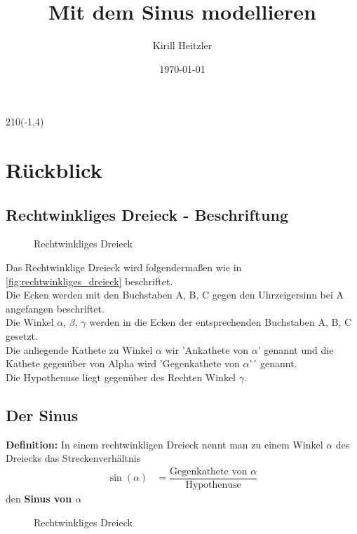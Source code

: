 \documentclass[12pt,a4paper]{article}
\title{Mit dem Sinus modellieren}
\author{Kirill Heitzler}
\date{\today}
\begin{document}
\maketitle
\begin{textblock}{210}(-1,4)
	\begin{figure}[h!] 
	\end{figure}
\end{textblock}
\newpage

\tableofcontents

\newpage

\section{Rückblick}

\subsection{Rechtwinkliges Dreieck - Beschriftung} 
\begin{figure}[hb!]
    \centering
    \def\svgwidth{200px}
    
    \caption{Rechtwinkliges Dreieck}
  	\label{fig:rechtwinkliges_dreieck}
\end{figure}
\noindent
Das Rechtwinklige Dreieck wird folgendermaßen wie in \autoref{fig:rechtwinkliges_dreieck} beschriftet. \\
Die Ecken werden mit den Buchstaben A, B, C gegen den Uhrzeigersinn bei A angefangen beschriftet. \\
Die Winkel $\alpha$, $\beta$, $\gamma$ werden in die Ecken der entsprechenden Buchstaben A, B, C gesetzt. \\
Die anliegende Kathete zu Winkel $\alpha$ wir 'Ankathete von $\alpha$' genannt und die Kathete gegenüber von Alpha wird 'Gegenkathete von $\alpha$'´ genannt. \\
Die Hypothenuse liegt gegenüber des Rechten Winkel $\gamma$.

\subsection{Der Sinus}
\textbf{Definition:} In einem rechtwinkligen Dreieck nennt man zu einem Winkel $\alpha$ des Dreiecks das Streckenverhältnis  
\begin{align}
 \sin(\alpha) &= \dfrac{\text{Gegenkathete von $\alpha$}}{\text{Hypothenuse}}
\end{align}
den \textbf{Sinus von $\alpha$}
\begin{figure}[hb!]
    \centering
    \def\svgwidth{200px}
    
    \caption{Rechtwinkliges Dreieck}
  	\label{fig:rechtwinkliges_dreieck_sinus}
\end{figure}
\newpage
\end{document}
